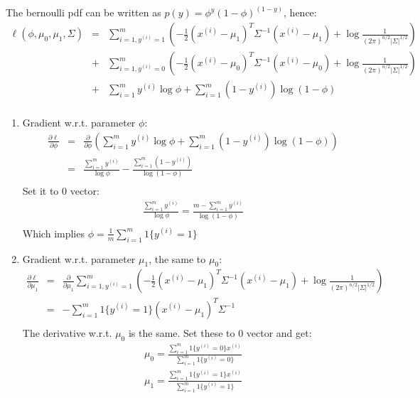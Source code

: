 \begin{answer}

The bernoulli pdf can be written as $p(y) = \phi^y (1-\phi)^{(1-y)}$, hence:
\begin{eqnarray*}
\ell(\phi, \mu_{0}, \mu_1, \Sigma) 
	&=& \sum_{i=1,y^{(i)}=1}^m \left( -\frac{1}{2}(x^{(i)}-\mu_1)^T \Sigma^{-1} (x^{(i)}-\mu_1) + \log {\frac{1}{(2\pi)^{n/2} |\Sigma|^{1/2}} }\right )\\
	&+& \sum_{i=1,y^{(i)}=0}^m \left( -\frac{1}{2}(x^{(i)}-\mu_0)^T \Sigma^{-1} (x^{(i)}-\mu_0) + \log {\frac{1}{(2\pi)^{n/2} |\Sigma|^{1/2}} }\right )\\
	&+& \sum_{i=1}^m y^{(i)} \log \phi + \sum_{i=1}^m (1-y^{(i)}) \log (1-\phi) \\
\end{eqnarray*}

\begin{enumerate}

\item Gradient w.r.t. parameter $\phi$:
\begin{eqnarray*}
\frac{\partial \ell}{\partial \phi}
	&=& \frac{\partial}{\partial \phi} \left (\sum_{i=1}^m y^{(i)} \log \phi + \sum_{i=1}^m (1-y^{(i)}) \log (1-\phi) \right)\\
	&=& \frac{\sum_{i=1}^m y^{(i)}}{\log \phi} - \frac{\sum_{i=1}^m (1-y^{(i)})}{\log (1-\phi)} \\
\end{eqnarray*}
Set it to 0 vector:
\begin{eqnarray*}
	\frac{\sum_{i=1}^m y^{(i)}}{\log \phi} = \frac{m- \sum_{i=1}^m y^{(i)}} {\log (1-\phi)} \\
\end{eqnarray*}
Which implies $\phi = \frac{1}{m} \sum_{i=1}^m 1\{y^{(i)} = 1\}$

\item Gradient w.r.t. parameter $\mu_1$, the same to $\mu_0$:
\begin{eqnarray*}
\frac{\partial \ell}{\partial \mu_1}
	&=& \frac{\partial}{\partial \mu_1} \sum_{i=1,y^{(i)}=1}^m \left( -\frac{1}{2}(x^{(i)}-\mu_1)^T \Sigma^{-1} (x^{(i)}-\mu_1) 
		+ \log {\frac{1}{(2\pi)^{n/2} |\Sigma|^{1/2}} }\right ) \\
	&=& -\sum_{i=1}^m 1\{y^{(i)}=1\}(x^{(i)}-\mu_1)^T \Sigma^{-1} \\
\end{eqnarray*}
The derivative w.r.t. $\mu_0$ is the same. Set these to 0 vector and get:
\begin{eqnarray*}
	\mu_0 = \frac{\sum_{i=1}^m 1\{y^{(i)} = 0\} x^{(i)}}{\sum_{i=1}^m 1\{y^{(i)} = 0\}} \\
	\mu_1 = \frac{\sum_{i=1}^m 1\{y^{(i)} = 1\} x^{(i)}}{\sum_{i=1}^m 1\{y^{(i)} = 1\}}
\end{eqnarray*}


\end{enumerate}
\end{answer}
